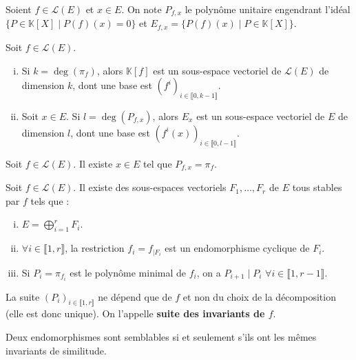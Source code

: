 
	\begin{notation}
		Soient $f \in \mathcal{L}(E)$ et $x \in E$. On note $P_{f,x}$ le polynôme unitaire engendrant l'idéal $\{ P \in \mathbb{K}[X] \mid P(f)(x) = 0 \}$ et $E_{f,x} = \{ P(f)(x) \mid P \in \mathbb{K}[X] \}$.
	\end{notation}

	\begin{lemma}
		Soit $f \in \mathcal{L}(E)$.
		\begin{enumerate}[(i)]
			\item Si $k = \deg(\pi_f)$, alors $\mathbb{K}[f]$ est un sous-espace vectoriel de $\mathcal{L}(E)$ de dimension $k$, dont une base est $(f^i)_{i \in \llbracket 0, k-1 \rrbracket}$.
			\item Soit $x \in E$. Si $l = \deg(P_{f,x})$, alors $E_x$ est un sous-espace vectoriel de $E$ de dimension $l$, dont une base est $(f^i(x))_{i \in \llbracket 0, l-1 \rrbracket}$.
		\end{enumerate}
	\end{lemma}

	\begin{lemma}
		Soit $f \in \mathcal{L}(E)$. Il existe $x \in E$ tel que $P_{f,x} = \pi_f$.
	\end{lemma}


	\begin{theorem}[Frobenius]
		Soit $f \in \mathcal{L}(E)$. Il existe des sous-espaces vectoriels $F_1, \dots, F_r$ de $E$ tous stables par $f$ tels que :
		\begin{enumerate}[(i)]
			\item $E = \bigoplus_{i = 1}^r F_i$.
			\item $\forall i \in \llbracket 1, r \rrbracket$, la restriction $f_i = f_{|F_i}$ est un endomorphisme cyclique de $F_i$.
			\item Si $P_i = \pi_{f_i}$ est le polynôme minimal de $f_i$, on a $P_{i+1} \mid P_i$ $\forall i \in \llbracket 1, r-1 \rrbracket$.
		\end{enumerate}
		La suite $(P_i)_{i \in \llbracket 1, r \rrbracket}$ ne dépend que de $f$ et non du choix de la décomposition (elle est donc unique). On l'appelle \textbf{suite des invariants de $f$}.
	\end{theorem}

	\begin{corollary}
		Deux endomorphismes sont semblables si et seulement s'ils ont les mêmes invariants de similitude.
	\end{corollary}

